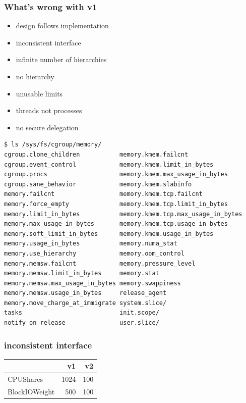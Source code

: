 \documentclass[serif]{beamer}
\begin{document}
\begin{frame}
  \frametitle{What's wrong with v1}

  \begin{itemize}
  \item design follows implementation \pause
  \item inconsistent interface \pause
  \item infinite number of hierarchies \pause
  \item no hierarchy \pause
  \item unusable limits \pause
  \item threads not processes \pause
  \item no secure delegation
  \end{itemize}
\end{frame}

\begin{frame}[fragile]
  \begin{verbatim}
$ ls /sys/fs/cgroup/memory/
cgroup.clone_children           memory.kmem.failcnt                
cgroup.event_control            memory.kmem.limit_in_bytes                       
cgroup.procs                    memory.kmem.max_usage_in_bytes                   
cgroup.sane_behavior            memory.kmem.slabinfo                             
memory.failcnt                  memory.kmem.tcp.failcnt                          
memory.force_empty              memory.kmem.tcp.limit_in_bytes     
memory.limit_in_bytes           memory.kmem.tcp.max_usage_in_bytes  
memory.max_usage_in_bytes       memory.kmem.tcp.usage_in_bytes      
memory.soft_limit_in_bytes      memory.kmem.usage_in_bytes              
memory.usage_in_bytes           memory.numa_stat                    
memory.use_hierarchy            memory.oom_control                  
memory.memsw.failcnt            memory.pressure_level               
memory.memsw.limit_in_bytes     memory.stat                          
memory.memsw.max_usage_in_bytes memory.swappiness                    
memory.memsw.usage_in_bytes     release_agent             
memory.move_charge_at_immigrate system.slice/            
tasks                           init.scope/              
notify_on_release               user.slice/                           
  \end{verbatim}                  
\end{frame}

\begin{frame}
  \frametitle{inconsistent interface}

  \begin{tabular}{l|rr}
                   & v1   & v2 \\\hline
    CPUShares     & 1024 & 100 \\
    BlockIOWeight &  500 & 100
  \end{tabular}
\end{frame}
\end{document}
